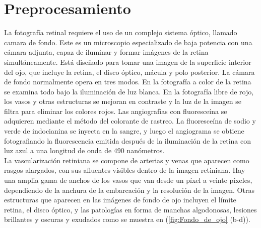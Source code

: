 \section{Preprocesamiento}

La fotografía retinal requiere el uso de un complejo sistema óptico, llamado camara de fondo. Este es  un microscopio especializado  de baja potencia con una cámara adjunta, capaz de iluminar y formar imágenes de la retina simultáneamente. Está diseñado para tomar una imagen de la superficie interior del ojo, que incluye la retina, el disco óptico, mácula y polo posterior. La cámara de fondo normalmente opera en tres modos. En la fotografía a color de la retina se examina todo bajo la iluminación de luz blanca. En la fotografía libre de rojo, los vasos y otras estructuras se mejoran en contraste y la luz de la imagen se filtra para eliminar los colores rojos. Las angiografías con fluoresceína se adquieren mediante el método del colorante de rastreo. La fluoresceína de sodio y verde de indocianina se inyecta en la sangre, y luego el angiograma se obtiene fotografiando la fluorescencia emitida después de la iluminación de la retina con luz azul a una longitud de onda de 490 nanómetros.\\

La vascularización retiniana se compone de arterias y venas que aparecen como rasgos alargados, con sus afluentes visibles dentro de la imagen retiniana. Hay una amplia gama de anchos de los vasos que van desde un píxel a veinte píxeles, dependiendo de la anchura de la embarcación y la resolución de la imagen. Otras estructuras que aparecen en las imágenes de fondo de ojo incluyen el límite retina, el disco óptico, y las patologías en forma de manchas algodonosas, lesiones brillantes y oscuras y exudados como se muestra en (\ref{fig:Fondo_de_ojo} (b-d)).\\

